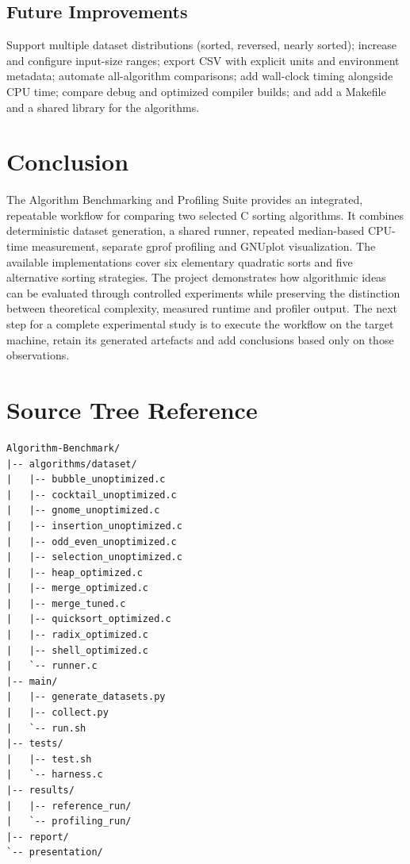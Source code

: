 \documentclass[12pt,a4paper,oneside]{report}
\begin{document}
\section{Future Improvements}
Support multiple dataset distributions (sorted, reversed, nearly sorted); increase and configure input-size ranges; export CSV with explicit units and environment metadata; automate all-algorithm comparisons; add wall-clock timing alongside CPU time; compare debug and optimized compiler builds; and add a Makefile and a shared library for the algorithms.

\chapter{Conclusion}
The Algorithm Benchmarking and Profiling Suite provides an integrated, repeatable workflow for comparing two selected C sorting algorithms. It combines deterministic dataset generation, a shared runner, repeated median-based CPU-time measurement, separate gprof profiling and GNUplot visualization. The available implementations cover six elementary quadratic sorts and five alternative sorting strategies. The project demonstrates how algorithmic ideas can be evaluated through controlled experiments while preserving the distinction between theoretical complexity, measured runtime and profiler output. The next step for a complete experimental study is to execute the workflow on the target machine, retain its generated artefacts and add conclusions based only on those observations.

\appendix
\chapter{Source Tree Reference}
\begin{lstlisting}
Algorithm-Benchmark/
|-- algorithms/dataset/
|   |-- bubble_unoptimized.c
|   |-- cocktail_unoptimized.c
|   |-- gnome_unoptimized.c
|   |-- insertion_unoptimized.c
|   |-- odd_even_unoptimized.c
|   |-- selection_unoptimized.c
|   |-- heap_optimized.c
|   |-- merge_optimized.c
|   |-- merge_tuned.c
|   |-- quicksort_optimized.c
|   |-- radix_optimized.c
|   |-- shell_optimized.c
|   `-- runner.c
|-- main/
|   |-- generate_datasets.py
|   |-- collect.py
|   `-- run.sh
|-- tests/
|   |-- test.sh
|   `-- harness.c
|-- results/
|   |-- reference_run/
|   `-- profiling_run/
|-- report/
`-- presentation/
\end{lstlisting}
\end{document}
